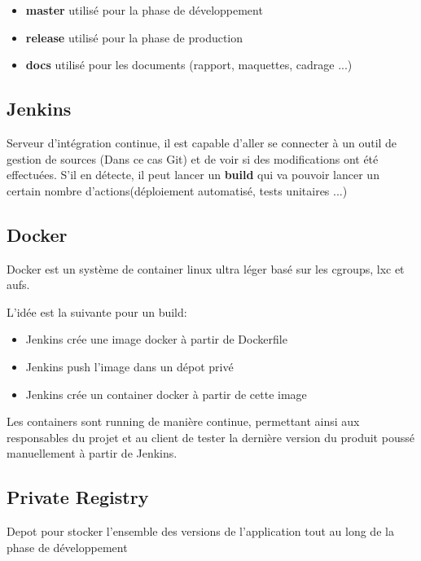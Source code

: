 \documentclass [a4paper,11pt]{article}
\begin{document}
\begin{itemize}
 \item \textbf{master} utilisé pour la phase de développement
 \item \textbf{release} utilisé pour la phase de production
 \item \textbf{docs} utilisé pour les documents (rapport, maquettes, cadrage ...)
\end{itemize}

\subsection{Jenkins}

Serveur d'intégration continue, il est capable d’aller se connecter à un outil de gestion de sources (Dans ce cas Git) et de voir si des modifications ont été effectuées. S’il en détecte, il peut lancer un \textbf{build} qui va pouvoir lancer un certain nombre d’actions(déploiement automatisé, tests unitaires ...)

\subsection{Docker}

Docker est un système de container linux ultra léger basé sur les cgroups, lxc et aufs.\newline

L'idée est la suivante pour un build:\newline

\begin{itemize}
 \item Jenkins crée une image docker à partir de Dockerfile
 \item Jenkins push l'image dans un dépot privé
 \item Jenkins crée un container docker à partir de cette image\newline
\end{itemize}

Les containers sont running de manière continue, permettant ainsi aux responsables du projet et au client de tester la dernière version du produit poussé manuellement à partir de Jenkins.

\subsection{Private Registry}

Depot pour stocker l'ensemble des versions de l'application tout au long de la phase de développement
\end{document}
